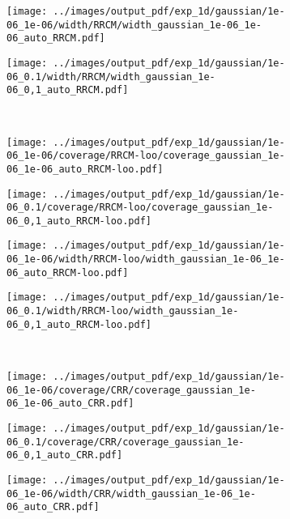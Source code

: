 \documentclass[conference]{IEEEtran}
\begin{document}
\begin{figure}
  \begin{subfigure}[b]{0.25\linewidth}
    \texttt{[image: ../images/output\_pdf/exp\_1d/gaussian/1e-06\_1e-06/width/RRCM/width\_gaussian\_1e-06\_1e-06\_auto\_RRCM.pdf]}
  \end{subfigure}%
  \begin{subfigure}[b]{0.25\linewidth}
    \texttt{[image: ../images/output\_pdf/exp\_1d/gaussian/1e-06\_0.1/width/RRCM/width\_gaussian\_1e-06\_0,1\_auto\_RRCM.pdf]}
  \end{subfigure}\\
  \begin{subfigure}[b]{0.25\linewidth}
    \texttt{[image: ../images/output\_pdf/exp\_1d/gaussian/1e-06\_1e-06/coverage/RRCM-loo/coverage\_gaussian\_1e-06\_1e-06\_auto\_RRCM-loo.pdf]}
  \end{subfigure}%
  \begin{subfigure}[b]{0.25\linewidth}
    \texttt{[image: ../images/output\_pdf/exp\_1d/gaussian/1e-06\_0.1/coverage/RRCM-loo/coverage\_gaussian\_1e-06\_0,1\_auto\_RRCM-loo.pdf]}
  \end{subfigure}%
  \begin{subfigure}[b]{0.25\linewidth}
    \texttt{[image: ../images/output\_pdf/exp\_1d/gaussian/1e-06\_1e-06/width/RRCM-loo/width\_gaussian\_1e-06\_1e-06\_auto\_RRCM-loo.pdf]}
  \end{subfigure}%
  \begin{subfigure}[b]{0.25\linewidth}
    \texttt{[image: ../images/output\_pdf/exp\_1d/gaussian/1e-06\_0.1/width/RRCM-loo/width\_gaussian\_1e-06\_0,1\_auto\_RRCM-loo.pdf]}
  \end{subfigure}\\
  \begin{subfigure}[b]{0.25\linewidth}
    \texttt{[image: ../images/output\_pdf/exp\_1d/gaussian/1e-06\_1e-06/coverage/CRR/coverage\_gaussian\_1e-06\_1e-06\_auto\_CRR.pdf]}
  \end{subfigure}%
  \begin{subfigure}[b]{0.25\linewidth}
    \texttt{[image: ../images/output\_pdf/exp\_1d/gaussian/1e-06\_0.1/coverage/CRR/coverage\_gaussian\_1e-06\_0,1\_auto\_CRR.pdf]}
  \end{subfigure}%
  \begin{subfigure}[b]{0.25\linewidth}
    \texttt{[image: ../images/output\_pdf/exp\_1d/gaussian/1e-06\_1e-06/width/CRR/width\_gaussian\_1e-06\_1e-06\_auto\_CRR.pdf]}

\end{subfigure}
\end{figure}
\end{document}
